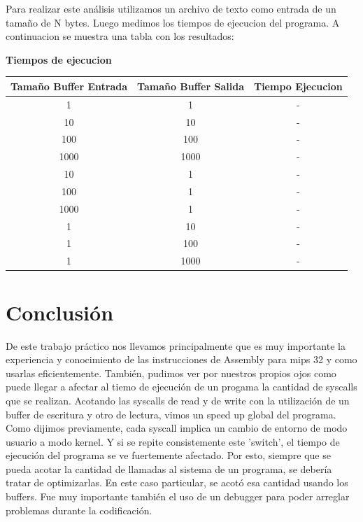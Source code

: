 \documentclass[11pt,a4paper]{article}
\begin{document}
Para realizar este análisis utilizamos un archivo de texto como entrada de un tamaño de N bytes. Luego medimos los tiempos de ejecucion del programa. A continuacion se muestra una tabla con los resultados:

\begin{table}[h]
	\centering
	\textbf{Tiempos de ejecucion}\\
	\begin{tabular}{|c|c|c|}
		\hline
		Tamaño Buffer Entrada & Tamaño Buffer Salida & Tiempo Ejecucion \\
		\hline
		1 & 1 & - \\
		\hline
		10 & 10 & - \\
		\hline
		100 & 100 & - \\
		\hline
		1000 & 1000 & - \\
		\hline
		10 & 1 & - \\
		\hline
		100 & 1 & - \\
		\hline
		1000 & 1 & - \\
		\hline
		1 & 10 & - \\
		\hline
		1 & 100 & - \\
		\hline
		1 & 1000 & - \\
		\hline
	\end{tabular}
\end{table}

\section{Conclusión}
De este trabajo práctico nos llevamos principalmente que es muy importante la experiencia y conocimiento de las instrucciones de Assembly para mips 32 y como usarlas eficientemente. También, pudimos ver por nuestros propios ojos como puede llegar a afectar al tiemo de ejecución de un progama la cantidad de syscalls que se realizan. Acotando las syscalls de read y de write con la utilización de un buffer de escritura y otro de lectura, vimos un speed up global del programa.
Como dijimos previamente, cada syscall implica un cambio de entorno de modo usuario a modo kernel. Y si se repite consistemente este 'switch', el tiempo de ejecución del programa se ve fuertemente afectado. Por esto, siempre que se pueda acotar la cantidad de llamadas al sistema de un programa, se debería tratar de optimizarlas. En este caso particular, se acotó esa cantidad usando los buffers. 
Fue muy importante también el uso de un debugger para poder arreglar problemas durante la codificación.

\appendix
\end{document}
